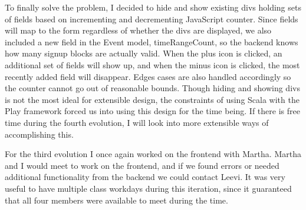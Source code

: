 \documentclass{article}
\begin{document}
To finally solve the problem, I decided to hide and show existing divs holding sets of fields based on incrementing and decrementing JavaScript counter. Since fields will map to the form regardless of whether the divs are displayed, we also included a new field in the Event model, timeRangeCount, so the backend knows how many signup blocks are actually valid. When the plus icon is clicked, an additional set of fields will show up, and when the minus icon is clicked, the most recently added field will disappear. Edges cases are also handled accordingly so the counter cannot go out of reasonable bounds. Though hiding and showing divs is not the most ideal for extensible design, the constraints of using Scala with the Play framework forced us into using this design for the time being. If there is free time during the fourth evolution, I will look into more extensible ways of accomplishing this.

For the third evolution I once again worked on the frontend with Martha. Martha and I would meet to work on the frontend, and if we found errors or needed additional functionality from the backend we could contact Leevi. It was very useful to have multiple class workdays during this iteration, since it guaranteed that all four members were available to meet during the time.
\end{document}
